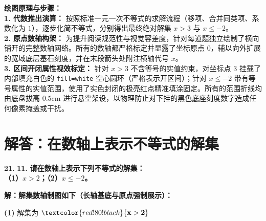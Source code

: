 \vspace{0.4cm}
{\small\color{blue!70!black}
\textbf{绘图原理与步骤：}\\
\textbf{1. 代数推出演算：} 按照标准一元一次不等式的求解流程（移项、合并同类项、系数化为 $1$），逐步化简不等式，分别得出最终绝对解集 $x > 3$ 与 $x \leqslant -2$。\\
\textbf{2. 原点数轴构架：} 为提升阅读规范性与视觉容差度，针对每道题独立绘制了横向铺开的完整数轴网络。所有的数轴都严格标定并显露了坐标原点 $0$，辅以向外扩展的宽域底层基石刻度，并在末段箭头处附注横轴代号 $x$。\\
\textbf{3. 区间开闭属性视效标定：} 针对 $x > 3$ 不含等号的实值约束，对坐标点 $3$ 挂载了内部填充白色的 \texttt{fill=white} 空心圆环（严格表示开区间）；针对 $x \leqslant -2$ 带有等号属性的实值范围，使用了实色封闭的极亮红点精准填涂固定。所有的范围折线均由底盘拔高 $0.5\mathrm{cm}$ 进行悬空架设，以物理防止对下挂的黑色底座刻度数字造成任何像素掩盖或干扰。
}

\newpage



\section{解答：在数轴上表示不等式的解集}

\vspace{0.6cm}

\textbf{\LARGE 21.} \textbf{\color{cyan!80!blue} 11. }\textbf{请在数轴上表示下列不等式的解集：\\
（1）$x > 2$；\hspace{4cm}（2）$x \leqslant -2$。}

\vspace{0.4cm}
\textbf{解：解集数轴制图如下（长轴基底与原点强制展示）：}

\vspace{0.4cm}
\noindent \textbf{(1)} 解集为 $\textcolor{red!80!black}{\mathbf{x > 2}}$ \par\vspace{0.2cm}
\begin{center}
\end{center}

